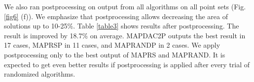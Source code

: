 \documentclass[conference]{IEEEtran}
\begin{document}
		We also ran postprocessing on output from all algorithms on all point sets (Fig. \ref{fig6} (f)).
		We emphasize that postprocessing allows decreasing the area of solutions up to 10-25\%.
		Table \ref{table3} shows results after postprocessing.
		The result is improved by 18.7\% on average.
		MAP{\textunderscore}DAC2{\textunderscore}P outputs the best result in 17 cases, MAP{\textunderscore}RS{\textunderscore}P in 11 cases, and MAP{\textunderscore}RAND{\textunderscore}P in 2 cases.
		We apply postprocessing only to the best output of MAP{\textunderscore}RS and MAP{\textunderscore}RAND.
		It is expected to get even better results if postprocessing is applied after every trial of randomized algorithms.
		
\end{document}
